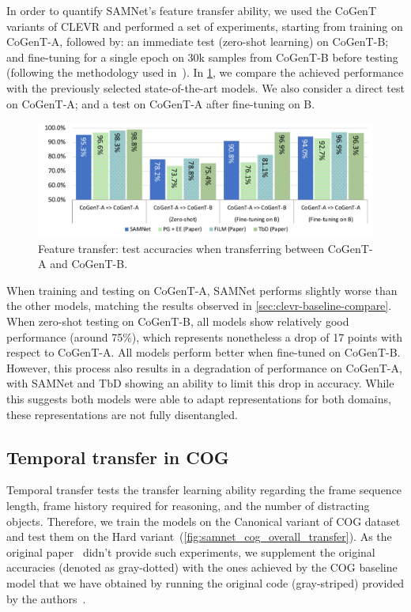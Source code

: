 In order to quantify SAMNet's feature transfer ability, we used the CoGenT variants of CLEVR and performed a set of experiments, starting from training on CoGenT-A, followed by:
an immediate test (zero-shot learning) on CoGenT-B; and fine-tuning for a single epoch on 30k samples from CoGenT-B before testing (following the methodology used in~\cite{johnson2017inferring,mascharka2018transparency,perez2018film,marois2018transfer}).
In \cref{fig:CoGenT-B-results}, we compare the achieved performance with the previously selected state-of-the-art models.
We also consider a direct test on CoGenT-A; and a test on CoGenT-A after fine-tuning on B.

\begin{figure}[htbp]
	\centering
	\includegraphics[width=\textwidth]{../img/plots/cogent_feature_transfer_baselines.pdf}
	\caption{Feature transfer: test accuracies when transferring between CoGenT-A and CoGenT-B.}
	\label{fig:CoGenT-B-results}
\end{figure}

When training and testing on CoGenT-A, SAMNet performs slightly worse than the other models, matching the results observed in \cref{sec:clevr-baseline-compare}.
When zero-shot testing on CoGenT-B, all models show relatively good performance (around 75\%), which represents nonetheless a drop of 17 points with respect to CoGenT-A.
All models perform better when fine-tuned on CoGenT-B.
However, this process also results in a degradation of performance on CoGenT-A, with SAMNet and TbD showing an ability to limit this drop in accuracy.
While this suggests both models were able to adapt representations for both domains, these representations are not fully disentangled.

\subsection{Temporal transfer in COG}
\label{sec:temporal}

Temporal transfer tests the transfer learning ability regarding the frame sequence length, frame history required for reasoning, and the number of distracting objects.
Therefore, we train the models on the Canonical variant of COG dataset and test them on the Hard variant~(\cref{fig:samnet_cog_overall_transfer}).
As the original paper~\cite{yang2018dataset} didn't provide such experiments, we supplement the original accuracies (denoted as gray-dotted) with the ones achieved by the COG baseline model that we have obtained by running the original code (gray-striped) provided by the authors~\cite{yang2018implement}.

